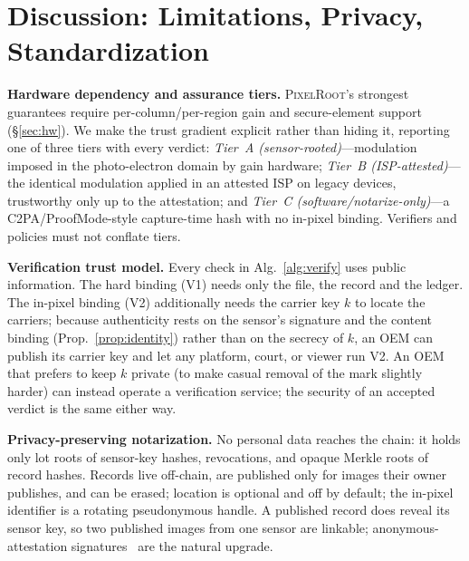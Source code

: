 \documentclass[journal]{IEEEtran}
\newcommand{\pr}{\textup{\textsc{PixelRoot}}}
\begin{document}
\section{Discussion: Limitations, Privacy, Standardization}\label{sec:discussion}

\textbf{Hardware dependency and assurance tiers.} \pr{}'s strongest guarantees
require per-column/per-region gain and secure-element support (\S\ref{sec:hw}).
We make the trust gradient explicit rather than hiding it, reporting one of three
tiers with every verdict: \emph{Tier~A (sensor-rooted)}---modulation imposed in
the photo-electron domain by gain hardware; \emph{Tier~B (ISP-attested)}---the
identical modulation applied in an attested ISP on legacy devices, trustworthy
only up to the attestation; and \emph{Tier~C (software/notarize-only)}---a
C2PA/ProofMode-style capture-time hash with no in-pixel binding. Verifiers and
policies must not conflate tiers.

\textbf{Verification trust model.} Every check in Alg.~\ref{alg:verify} uses
public information. The hard binding (V1) needs only the file, the record and the
ledger. The in-pixel binding (V2) additionally needs the carrier key $k$ to
locate the carriers; because authenticity rests on the sensor's signature and the
content binding (Prop.~\ref{prop:identity}) rather than on the secrecy of $k$, an
OEM can publish its carrier key and let any platform, court, or viewer run V2.
An OEM that prefers to keep $k$ private (to make casual removal of the mark
slightly harder) can instead operate a verification service; the security of an
accepted verdict is the same either way.

\ifshort
\textbf{Privacy-preserving notarization.} No personal data reaches the chain:
it holds only lot roots of sensor-key hashes, revocations, and opaque Merkle roots
of record hashes. Records live off-chain, are published only for images their
owner publishes, and can be erased; location is optional and off by default; the
in-pixel identifier is a rotating pseudonymous handle. A published record does
reveal its sensor key, so two published images from one sensor are linkable;
anonymous-attestation signatures~\cite{brickell2004daa} are the natural upgrade.
\end{document}
